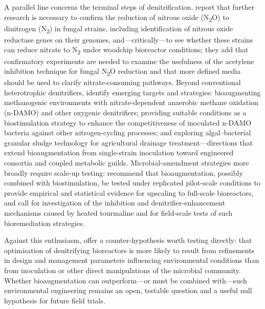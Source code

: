 A parallel line concerns the terminal steps of denitrification. \textcite{Aldossari2021} report that further research is necessary to confirm the reduction of nitrous oxide (N\textsubscript{2}O) to dinitrogen (N\textsubscript{2}) in fungal strains, including identification of nitrous oxide reductase genes on their genomes, and---critically---to see whether these strains can reduce nitrate to N\textsubscript{2} under woodchip bioreactor conditions; they add that confirmatory experiments are needed to examine the usefulness of the acetylene inhibition technique for fungal N\textsubscript{2}O reduction and that more defined media should be used to clarify nitrate-consuming pathways. Beyond conventional heterotrophic denitrifiers, \textcite{Wang2025b} identify emerging targets and strategies: bioaugmenting methanogenic environments with nitrate-dependent anaerobic methane oxidation (n-DAMO) and other oxygenic denitrifiers; providing suitable conditions as a biostimulation strategy to enhance the competitiveness of inoculated n-DAMO bacteria against other nitrogen-cycling processes; and exploring algal--bacterial granular sludge technology for agricultural drainage treatment---directions that extend bioaugmentation from single-strain inoculation toward engineered consortia and coupled metabolic guilds. Microbial-amendment strategies more broadly require scale-up testing: \textcite{Jeglot2022} recommend that bioaugmentation, possibly combined with biostimulation, be tested under replicated pilot-scale conditions to provide empirical and statistical evidence for upscaling to full-scale bioreactors, and \textcite{Ma2021} call for investigation of the inhibition and denitrifier-enhancement mechanisms caused by heated tourmaline and for field-scale tests of such bioremediation strategies.

Against this enthusiasm, \textcite{Hathaway2015} offer a counter-hypothesis worth testing directly: that optimisation of denitrifying bioreactors is more likely to result from refinements in design and management parameters influencing environmental conditions than from inoculation or other direct manipulations of the microbial community. Whether bioaugmentation can outperform---or must be combined with---such environmental engineering remains an open, testable question and a useful null hypothesis for future field trials.

